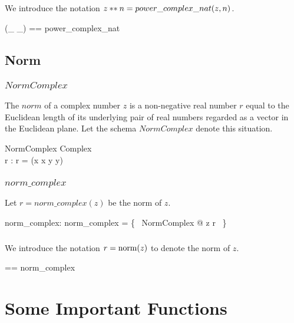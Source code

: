 \documentclass{amsart}
\begin{document}
\subsubsection{}

We introduce the notation $z \mathbin{**} n = power\_complex\_nat(z, n)$.

\begin{zed}
	(\_ \powCN \_) == power\_complex\_nat
\end{zed}

\subsection{Norm}

\subsubsection{$NormComplex$}

The $norm$ of a complex number $z$ is a non-negative real number $r$
equal to the Euclidean length of its underlying pair of real numbers regarded
as a vector in the Euclidean plane.
Let the schema $NormComplex$ denote this situation.

\begin{schema}{NormComplex}
	Complex \\
	r : \R
\where
	r = \sqrtR(x \mulR x \addR y \mulR y)
\end{schema}

\subsubsection{$norm\_complex$}

Let $r = norm\_complex(z)$ be the norm of $z$.

\begin{axdef}
	norm\_complex: \C \fun \R
\where
	norm\_complex = \{~ NormComplex @ z \mapsto r ~\}
\end{axdef}

\subsubsection{}

We introduce the notation $r = \operatorname{norm}(z)$ to denote the norm of $z$.

\begin{zed}
	\normC == norm\_complex
\end{zed}

\section{Some Important Functions}
\end{document}

